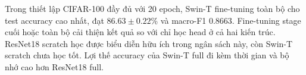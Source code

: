Trong thiết lập CIFAR-100 đầy đủ với 20 epoch, Swin-T fine-tuning toàn bộ cho test accuracy cao nhất, đạt $86.63 \pm 0.22$\% và macro-F1 0.8663. Fine-tuning stage cuối hoặc toàn bộ cải thiện kết quả so với chỉ học head ở cả hai kiến trúc. ResNet18 scratch học được biểu diễn hữu ích trong ngân sách này, còn Swin-T scratch chưa học tốt. Lợi thế accuracy của Swin-T full đi kèm thời gian và bộ nhớ cao hơn ResNet18 full.
